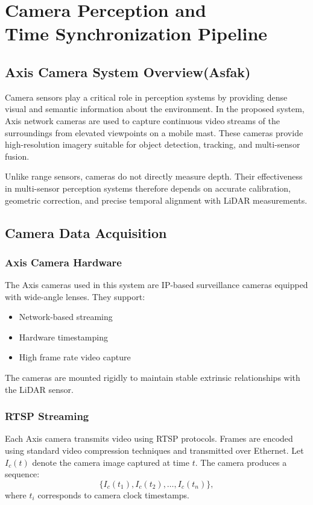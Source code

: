 \documentclass[12pt,a4paper]{report}
\begin{document}
\chapter[Camera Perception Pipeline]{Camera Perception and \\ Time Synchronization Pipeline}

\section{Axis Camera System Overview(Asfak)}
Camera sensors play a critical role in perception systems by providing dense visual and semantic information about the environment. In the proposed system, Axis network cameras are used to capture continuous video streams of the surroundings from elevated viewpoints on a mobile mast. These cameras provide high-resolution imagery suitable for object detection, tracking, and multi-sensor fusion.

Unlike range sensors, cameras do not directly measure depth. Their effectiveness in multi-sensor perception systems therefore depends on accurate calibration, geometric correction, and precise temporal alignment with LiDAR measurements.

\section{Camera Data Acquisition}
\subsection{Axis Camera Hardware}
The Axis cameras used in this system are IP-based surveillance cameras equipped with wide-angle lenses. They support:
\begin{itemize}
    \item Network-based streaming
    \item Hardware timestamping
    \item High frame rate video capture
\end{itemize}
The cameras are mounted rigidly to maintain stable extrinsic relationships with the LiDAR sensor.

\subsection{RTSP Streaming}
Each Axis camera transmits video using RTSP protocols. Frames are encoded using standard video compression techniques and transmitted over Ethernet. Let $I_c(t)$ denote the camera image captured at time $t$. The camera produces a sequence:
\begin{equation}
\{ I_c(t_1), I_c(t_2), \dots, I_c(t_n) \},
\end{equation}
where $t_i$ corresponds to camera clock timestamps.
\end{document}
